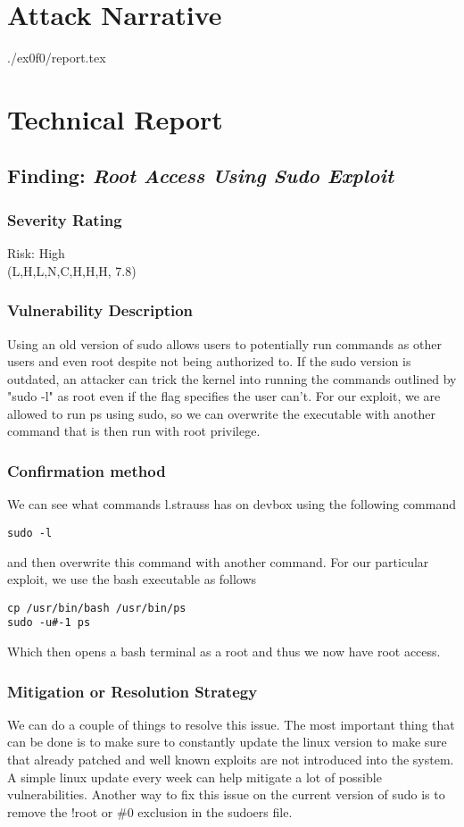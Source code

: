     



\section{Attack Narrative}
./ex0f0/report.tex

\section{Technical Report}
  \subsection{Finding: \emph{Root Access Using Sudo Exploit}}

	\subsubsection*{Severity Rating}
        Risk: High \\
		\cvss(L,H,L,N,C,H,H,H, 7.8)
		
  	\subsubsection*{Vulnerability Description}
  	Using an old version of sudo allows users to potentially run commands as other users and even root despite not being authorized to. If the sudo version is outdated,
    an attacker can trick the kernel into running the commands outlined by "sudo -l" as root even if the flag specifies the user can't. For our exploit, we are allowed to run ps
    using sudo, so we can overwrite the executable with another command that is then run with root privilege. 
  	\subsubsection*{Confirmation method}
  	We can see what commands l.strauss has on devbox using the following command
\begin{verbatim}
sudo -l
\end{verbatim}
    and then overwrite this command with another command. For our particular exploit, we use the bash executable as follows
\begin{verbatim}
cp /usr/bin/bash /usr/bin/ps
sudo -u#-1 ps
\end{verbatim}
    Which then opens a bash terminal as a root and thus we now have root access. 

    \subsubsection*{Mitigation or Resolution Strategy}
    We can do a couple of things to resolve this issue. The most important thing that can be done is to make sure to constantly update the linux version to make sure
    that already patched and well known exploits are not introduced into the system. A simple linux update every week can help mitigate a lot of possible vulnerabilities. Another way
    to fix this issue on the current version of sudo is to remove the !root or {\#}0 exclusion in the sudoers file.


